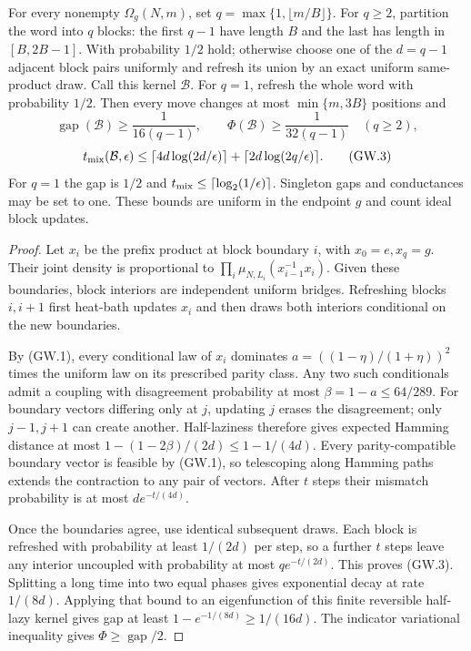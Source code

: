 \begin{theorem}
\label{thm:growing-window-mixing}
For every nonempty $\Omega_g(N,m)$, set $q=\max\{1,\lfloor m/B\rfloor\}$.
For $q\ge2$, partition the word into $q$ blocks: the first $q-1$ have
length $B$ and the last has length in $[B,2B-1]$.  With probability $1/2$
hold; otherwise choose one of the $d=q-1$ adjacent block pairs uniformly
and refresh its union by an exact uniform same-product draw.  Call this
kernel $\mathcal B$.  For $q=1$, refresh the whole word with probability
$1/2$.  Then every move changes at most $\min\{m,3B\}$ positions and
\[
 \operatorname{gap}(\mathcal B)\ge\frac1{16(q-1)},\qquad
 \Phi(\mathcal B)\ge\frac1{32(q-1)}\quad(q\ge2),       \tag{GW.2}
\]
\[
 t_{\rm mix}(\mathcal B,\epsilon)
 \le \lceil4d\log(2d/\epsilon)\rceil
      +\lceil2d\log(2q/\epsilon)\rceil.              \tag{GW.3}
\]
For $q=1$ the gap is $1/2$ and $t_{\rm mix}\le\lceil\log_2(1/\epsilon)\rceil$.
Singleton gaps and conductances may be set to one.  These bounds are
uniform in the endpoint $g$ and count ideal block updates.
\end{theorem}
\begin{proof}
Let $x_i$ be the prefix product at block boundary $i$, with $x_0=e,x_q=g$.
Their joint density is proportional to
$\prod_i\mu_{N,L_i}(x_{i-1}^{-1}x_i)$.
Given these boundaries, block interiors are independent uniform bridges.
Refreshing blocks $i,i+1$ first heat-bath updates $x_i$ and then draws
both interiors conditional on the new boundaries.

By (GW.1), every conditional law of $x_i$ dominates
$a=((1-\eta)/(1+\eta))^2$ times the uniform law on its prescribed parity
class.  Any two such conditionals admit a coupling with disagreement
probability at most $\beta=1-a\le64/289$.  For boundary vectors differing
only at $j$, updating $j$ erases the disagreement; only $j-1,j+1$ can
create another.  Half-laziness therefore gives expected Hamming distance
at most $1-(1-2\beta)/(2d)\le1-1/(4d)$.
Every parity-compatible boundary vector is feasible by (GW.1), so
telescoping along Hamming paths extends the contraction to any pair of
vectors.  After $t$ steps their mismatch probability is at most
$d e^{-t/(4d)}$.

Once the boundaries agree, use identical subsequent draws.  Each block
is refreshed with probability at least $1/(2d)$ per step, so a further
$t$ steps leave any interior uncoupled with probability at most
$q e^{-t/(2d)}$.  This proves (GW.3).  Splitting a long time into two
equal phases gives exponential decay at rate $1/(8d)$.  Applying that
bound to an eigenfunction of this finite reversible half-lazy kernel
gives gap at least $1-e^{-1/(8d)}\ge1/(16d)$.
The indicator variational inequality gives $\Phi\ge\operatorname{gap}/2$.
\end{proof}

